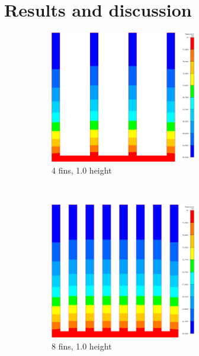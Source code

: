 \section{Results and discussion}

\begin{figure}[h]
\begin{subfigure}[t] {0.23\textwidth}
\centering
\includegraphics[width=0.7\textwidth]{../figures/heatsink4_h105_gmf005.png}
\caption{4 fins, \num{1.0} height}
\label{fig:mesh_temps_res_4_1}
\end{subfigure}
~
\begin{subfigure}[t] {0.23\textwidth}
\centering
\includegraphics[width=0.7\textwidth]{../figures/heatsink8_h105_gmf005.png}
\caption{8 fins, \num{1.0} height}
\label{fig:mesh_temps_res_8_1}
\end{subfigure}
~
\begin{subfigure}[t] {0.23\textwidth}

\end{subfigure}
\end{figure}
